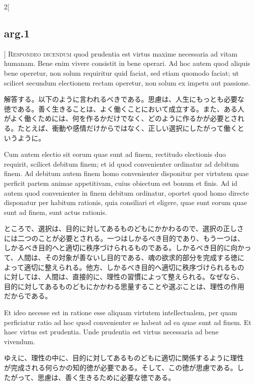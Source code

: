 \documentclass[paper=a4paper,fontsize=10pt,jafontsize=9pt,titlepage]{jlreq}
\begin{document}
\begin{paracol}{2}[\subsection{arg.1}]
{\scshape Respondeo dicendum} quod prudentia est virtus maxime
necessaria ad vitam humanam. Bene enim vivere consistit in bene
operari. Ad hoc autem quod aliquis bene operetur, non solum requiritur
quid faciat, sed etiam quomodo faciat; ut scilicet secundum electionem
rectam operetur, non solum ex impetu aut passione.

\switchcolumn

解答する。以下のように言われるべきである。思慮は、人生にもっとも必要な
徳である。善く生きることは、よく働くことにおいて成立する。また、ある人
がよく働くためには、何を作るかだけでなく、どのように作るかが必要とされ
る。たとえば、衝動や感情だけからではなく、正しい選択にしたがって働くと
いうように。

\switchcolumn*

Cum autem electio sit eorum quae sunt ad finem, rectitudo electionis
duo requirit, scilicet debitum finem; et id quod convenienter
ordinatur ad debitum finem. Ad debitum autem finem homo convenienter
disponitur per virtutem quae perficit partem animae appetitivam, cuius
obiectum est bonum et finis. Ad id autem quod convenienter in finem
debitum ordinatur, oportet quod homo directe disponatur per habitum
rationis, quia consiliari et eligere, quae sunt eorum quae sunt ad
finem, sunt actus rationis.

\switchcolumn

ところで、選択は、目的に対してあるものどもにかかわるので、選択の正しさ
には二つのことが必要とされる。一つはしかるべき目的であり、もう一つは、
しかるべき目的へと適切に秩序づけられるものである。しかるべき目的に向かっ
て、人間は、その対象が善ないし目的である、魂の欲求的部分を完成する徳に
よって適切に整えられる。他方、しかるべき目的へ適切に秩序づけられるもの
に対しては、人間は、直接的に、理性の習慣によって整えられる。なぜなら、
目的に対してあるものどもにかかわる思量することや選ぶことは、理性の作用
だからである。

\switchcolumn*

Et ideo necesse est in ratione esse aliquam virtutem intellectualem,
per quam perficiatur ratio ad hoc quod convenienter se habeat ad ea
quae sunt ad finem. Et haec virtus est prudentia. Unde prudentia est
virtus necessaria ad bene vivendum.

\switchcolumn

ゆえに、理性の中に、目的に対してあるものどもに適切に関係するように理性
が完成される何らかの知的徳が必要である。そして、この徳が思慮である。し
たがって、思慮は、善く生きるために必要な徳である。

\switchcolumn*[\subsection{ad.1}]


\end{paracol}
\end{document}

